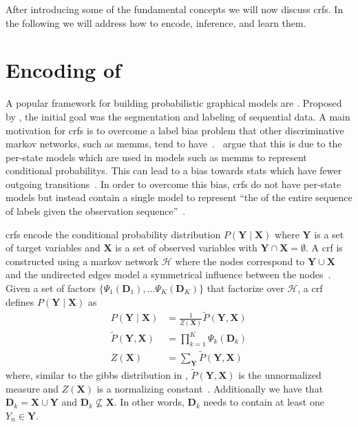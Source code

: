 \bigskip

After introducing some of the fundamental concepts we will now discuss \glspl{crf}. In the following we will address how to encode, inference, and learn them.

\section{Encoding of }\label{sec:definition-crfs}
A popular framework for building \glspl{probabilistic graphical model} are .
Proposed by \citet{lafferty2001conditional}, the initial goal was the segmentation and labeling of sequential data.
A main motivation for \glspl{crf} is to overcome a label bias problem that other discriminative \glspl{markov network}, such as \glspl{memm}, tend to have~\citep{lafferty2001conditional}.\
\citet{lafferty2001conditional} argue that this is due to the per-state models which are used in models such as \glspl{memm} to represent \glspl{conditional probability}.
This can lead to a bias towards stats which have fewer outgoing transitions~\citep{lafferty2001conditional}.
In order to overcome this bias, \glspl{crf} do not have per-state models but instead contain a single model to represent ``the  of the entire sequence of labels given the observation sequence''~\citep{lafferty2001conditional}.

\bigskip

\Glspl{crf} encode the \gls{conditional probability distribution} $P(\mathbf{Y}\mid\mathbf{X})$ where $\mathbf{Y}$ is a set of \glspl{target variable} and $\mathbf{X}$ is a set of \glspl{observed variable} with $\mathbf{Y}\cap\mathbf{X}=\emptyset$.
A \gls{crf} is constructed using a \gls{markov network} $\mathcal{H}$ where the nodes correspond to $\mathbf{Y}\cup\mathbf{X}$ and the undirected edges model a symmetrical influence between the nodes~\citep{koller2009probabilistic}.
Given a set of \glspl{factor} $\{\Psi_1(\mathbf{D}_1),\dots\Psi_K(\mathbf{D}_K)\}$ that factorize over $\mathcal{H}$, a \gls{crf} defines $P(\mathbf{Y}\mid\mathbf{X})$ as~\citep{koller2009probabilistic}
\begin{equation}
  \label{equ:crf-factor}
  \begin{split}
    P(\mathbf{Y}\mid\mathbf{X}) & = \frac{1}{Z(\mathbf{X})}\tilde{P}(\mathbf{Y},\mathbf{X}) \\
    \tilde{P}(\mathbf{Y},\mathbf{X}) &= \prod_{k=1}^{K}\Psi_k\left(\mathbf{D}_k\right) \\
    Z(\mathbf{X}) & = \sum_{\mathbf{Y}}\tilde{P}(\mathbf{Y},\mathbf{X})
  \end{split}
\end{equation}
where, similar to the \gls{gibbs distribution} in , $\tilde{P}(\mathbf{Y},\mathbf{X})$ is the unnormalized measure and $Z(\mathbf{X})$ is a normalizing constant~\citep{koller2009probabilistic}.
Additionally we have that $\mathbf{D}_k=\mathbf{X}\cup\mathbf{Y}$ and $\mathbf{D}_k\not\subseteq\mathbf{X}$.
In other words, $\mathbf{D}_k$ needs to contain at least one $Y_n\in \mathbf{Y}$.

